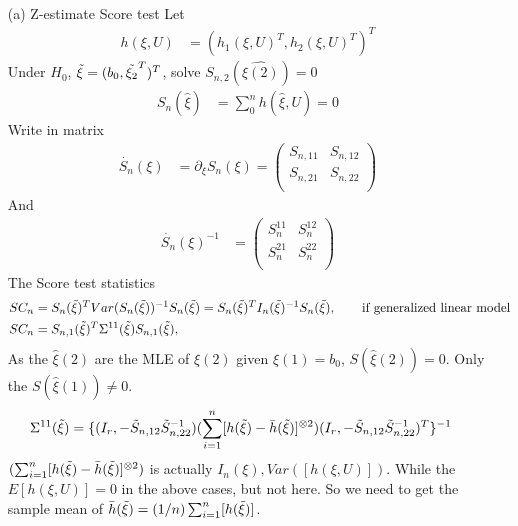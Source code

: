 \begin{itemize}
    \item [(a)] Z-estimate Score test
    Let 
\begin{align*}
    h(\xi, U) &= \left( h_1(\xi, U)^T,  h_2(\xi, U)^T\right)^T
\end{align*}
Under $H_0$, $\Tilde{\xi} = (b_0, \Tilde{\xi_2}^T)^T$, solve $S_{n,2}(\hat{\xi(2)}) = 0$
\begin{align*}
    S_n(\hat{\xi}) &= \sum_{0}^n h\left( \hat{\xi}, U\right) = 0
\end{align*}
Write in matrix
\begin{align*}
    \dot{S_n}(\xi) &= \partial_{\xi} S_n(\xi) =  \begin{pmatrix}
    S_{n,11}  & S_{n,12} \\
    S_{n,21} &  S_{n,22}  \\
    \end{pmatrix}
\end{align*}
And
\begin{align*}
 \dot{S_n}(\xi)^{-1} &= \begin{pmatrix}
           S_{n}^{11}  & S_{n}^{12} \\
            S_{n}^{21} &  S_{n}^{22}  \\
         \end{pmatrix}
\end{align*}
The Score test statistics
\begin{align*}
 SC_n &= S_{n}(\Tilde{\xi})^T Var(S_n(\Tilde{\xi}))^{-1} S_{n}(\Tilde{\xi})= S_{n}(\Tilde{\xi})^T I_n(\Tilde{\xi})^{-1} S_{n}(\Tilde{\xi}), \qquad \text{if generalized linear model}\\
 SC_n &= S_{n,1}(\Tilde{\xi})^T \Sigma^{11}(\Tilde{\xi}) S_{n,1}(\Tilde{\xi}) , 
\end{align*}
As the $\hat{\xi}(2)$ are the MLE of ${\xi}(2)$ given ${\xi}(1) = b_0$, $S(\hat{\xi}(2)) = 0$. Only the $S(\hat{\xi}(1)) \neq 0$.
\begin{align*}
\Sigma^{11}(\Tilde{\xi}) &= \{(I_r, -\Tilde{S}_{n,12}\Tilde{S}^{-1}_{n,22}) (\sum_{i=1}^n [h(\Tilde{\xi}) - \bar{h}(\Tilde{\xi})]^{\otimes 2}) (I_r, -\Tilde{S}_{n,12}\Tilde{S}^{-1}_{n,22})^T\}^{-1}
\end{align*}
$(\sum_{i=1}^n [h(\Tilde{\xi}) - \bar{h}(\Tilde{\xi})]^{\otimes 2})$ is actually $I_n(\xi), Var([h(\xi,U)])$. While the $E[h(\xi,U)] = 0$ in the above cases, but not here. So we need to get the sample mean of $\bar{h}(\Tilde{\xi}) = (1/n) \sum_{i=1}^n [h(\Tilde{\xi})]$. \\

\end{itemize}

